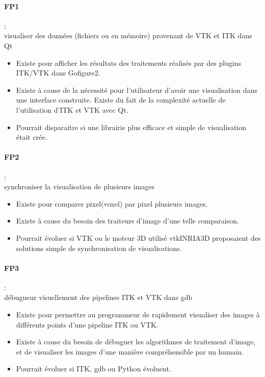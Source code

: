 \paragraph*{FP1} :\\ visualiser des données (fichiers ou en mémoire) provenant de VTK et ITK dans Qt
\begin{itemize}
  \item Existe pour afficher les résultats des traitements réalisés par des plugins ITK/VTK dans Gofigure2.
  \item Existe à cause de la nécessité pour l'utilisateur d'avoir une visualisation dans une interface construite.
  Existe du fait de la complexité actuelle de l'utilisation d'ITK et VTK avec Qt. 
  \item Pourrait disparaitre si une librairie plus efficace et simple de visualisation était crée.
\end{itemize}

\paragraph*{FP2} :\\ synchroniser la visualisation de plusieurs images
\begin{itemize}
  \item Existe pour comparer pixel(voxel) par pixel plusieurs images.
  \item Existe à cause du besoin des traiteurs d'image d'une telle comparaison.
  \item Pourrait évoluer si VTK ou le moteur 3D utilisé vtkINRIA3D\cite{vtkINRIA}
  proposaient des solutions simple de synchronisation de visualisations.
\end{itemize}

\paragraph*{FP3} :\\ débugueur visuellement des pipelines ITK et VTK dans gdb
\begin{itemize}
  \item Existe pour permettre au programmeur de rapidement visualiser des images
   à différents points d'une pipeline ITK ou VTK.
  \item Existe à cause du besoin de débuguer les algorithmes de traitement d'image,
  et de visualiser les images d'une manière compréhensible par un humain.
  \item Pourrait évoluer si ITK, gdb ou Python évoluent.
\end{itemize}

